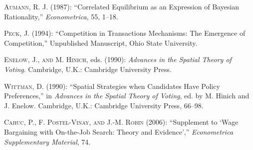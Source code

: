 \documentclass[ecta,nameyear,final]{econsocart}
\theoremstyle{plain}
\theoremstyle{remark}
\begin{document}
\begin{thebibliography}{}
%
\textsc{Aumann, R. J.} (1987):
``Correlated Equilibrium as an Expression of Bayesian Rationality,''
\textit{Econometrica}, 55, 1--18.
\endbibitem

\textsc{Peck, J.} (1994):
``Competition in Transactions Mechanisms: The Emergence of Competition,''
Unpublished Manuscript, Ohio State University.
\endbibitem

\textsc{Enelow, J., and M. Hinich}, eds. (1990):
\textit{Advances in the Spatial Theory of Voting}.
Cambridge, U.K.: Cambridge University Press.
\endbibitem

\textsc{Wittman, D.} (1990):
``Spatial Strategies when Candidates Have Policy Preferences,''
in \textit{Advances in the Spatial Theory of Voting},
ed. by M. Hinich and J. Enelow.
Cambridge, U.K.: Cambridge University Press, 66--98.
\endbibitem

\textsc{Cahuc, P., F. Postel-Vinay, and J.-M. Robin} (2006): 
``Supplement to `Wage Bargaining with On-the-Job Search: Theory and Evidence',''
\textit{Econometrica Supplementary Material}, 74.
\endbibitem
\end{thebibliography}
\end{document}
